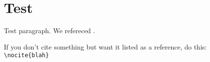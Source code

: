 \documentclass[12pt]{article}
\begin{document}
\section{Test}
Test paragraph. We refereced \cite {supercurves}.

If you don't cite something but want it listed as a reference, do this:
\verb|\nocite{blah}|


\end{document}
